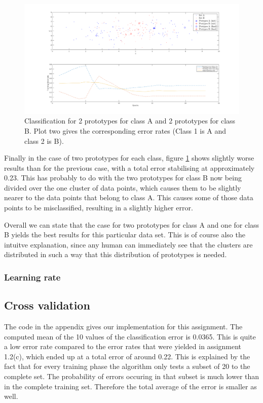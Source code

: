 \documentclass[10pt]{article}
\begin{document}
\begin{figure}[H]
 \centering
 \includegraphics[width=\textwidth]{Fig12_d.png}
 \caption{Classification for 2 prototypes for class A and 2 prototypes for class B. Plot two gives the corresponding error rates (Class 1 is A and class 2 is B).}
 \label{fig1.12d}
\end{figure}
Finally in the case of two prototypes for each class, figure \ref{fig1.12d} shows slightly worse results than for the previous case, with a total error stabilising at approximately 0.23. This has probably to do with the two prototypes for class B now being divided over the one cluster of data points, which causes them to be slightly nearer to the data points that belong to class A. This causes some of those data points to be misclassified, resulting in a slightly higher error.

\bigskip
\noindent Overall we can state that the case for two prototypes for class A and one for class B yields the best results for this particular data set. This is of course also the intuitve explanation, since any human can immediately see that the clusters are distributed in such a way that this distribution of prototypes is needed.

\subsubsection{Learning rate}


\subsection{Cross validation}
The code in the appendix gives our implementation for this assignment. The computed mean of the 10 values of the classification error is 0.0365. This is quite a low error rate compared to the error rates that were yielded in assignment 1.2(c), which ended up at a total error of around 0.22. This is explained by the fact that for every training phase the algorithm only tests a subset of 20 to the complete set. The probability of errors occuring in that subset is much lower than in the complete training set. Therefore the total average of the error is smaller as well.
\end{document}
